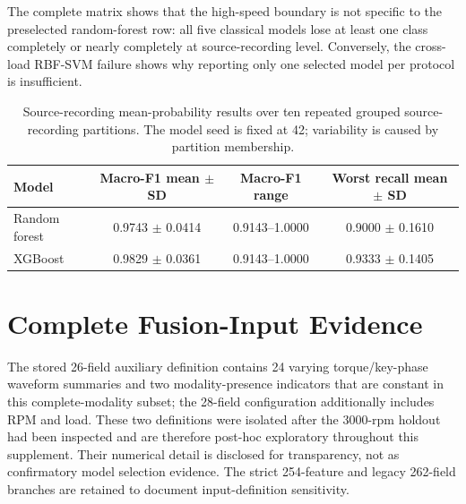 \documentclass[11pt]{article}
\begin{document}
The complete matrix shows that the high-speed boundary is not specific to the preselected random-forest row: all five classical models lose at least one class completely or nearly completely at source-recording level. Conversely, the cross-load RBF-SVM failure shows why reporting only one selected model per protocol is insufficient.

\begin{table}[H]
\centering
\caption{Source-recording mean-probability results over ten repeated grouped source-recording partitions. The model seed is fixed at 42; variability is caused by partition membership.}
\label{tab:s_repeated_source}
\small
\begin{tabular}{lccc}
\toprule
Model & Macro-F1 mean $\pm$ SD & Macro-F1 range & Worst recall mean $\pm$ SD \\
\midrule
Random forest & 0.9743 $\pm$ 0.0414 & 0.9143--1.0000 & 0.9000 $\pm$ 0.1610 \\
XGBoost & 0.9829 $\pm$ 0.0361 & 0.9143--1.0000 & 0.9333 $\pm$ 0.1405 \\
\bottomrule
\end{tabular}
\end{table}


\section{Complete Fusion-Input Evidence}
The stored 26-field auxiliary definition contains 24 varying torque/key-phase waveform summaries and two modality-presence indicators that are constant in this complete-modality subset; the 28-field configuration additionally includes RPM and load. These two definitions were isolated after the 3000-rpm holdout had been inspected and are therefore post-hoc exploratory throughout this supplement. Their numerical detail is disclosed for transparency, not as confirmatory model selection evidence. The strict 254-feature and legacy 262-field branches are retained to document input-definition sensitivity.
\end{document}
